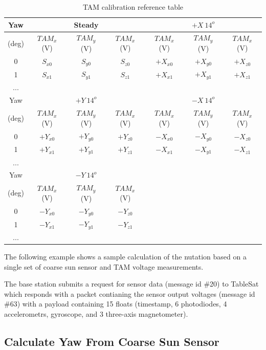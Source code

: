 \begin{table}[H]
  \centering
  \begin{tabular}{c|ccc|ccc}
    \hline
    Yaw   & & Steady & & & $+X \ 14^o$ & \\ \hline
    (deg) & $TAM_x$ (V) & $TAM_y$ (V) & $TAM_x$ (V) & $TAM_x$ (V) & $TAM_y$ (V) & $TAM_x$ (V)  \\ \hline
    0 & $S_{x0}$ & $S_{y0}$ & $S_{z0}$ & $+X_{x0}$ & $+X_{y0}$ & $+X_{z0}$ \\ \hline
    1 & $S_{x1}$ & $S_{y1}$ & $S_{z1}$ & $+X_{x1}$ & $+X_{y1}$ & $+X_{z1}$ \\ \hline
    ... & & & & & &  \\ \hline
    Yaw   & & $+Y \ 14^o$ & & & $-X \ 14^o$ & \\ \hline
    (deg) & $TAM_x$ (V) & $TAM_y$ (V) & $TAM_x$ (V) & $TAM_x$ (V) & $TAM_y$ (V) & $TAM_x$ (V)  \\ \hline
    0 & $+Y_{x0}$ & $+Y_{y0}$ & $+Y_{z0}$ & $-X_{x0}$ & $-X_{y0}$ & $-X_{z0}$ \\ \hline
    1 & $+Y_{x1}$ & $+Y_{y1}$ & $+Y_{z1}$ & $-X_{x1}$ & $-X_{y1}$ & $-X_{z1}$ \\ \hline
    ... & & & & & &  \\ \hline
    Yaw   & & $-Y \ 14^o$ & &  \\ \hline
    (deg) & $TAM_x$ (V) & $TAM_y$ (V) & $TAM_x$ (V)  \\ \hline
    0 & $-Y_{x0}$ & $-Y_{y0}$ & $-Y_{z0}$  \\ \hline
    1 & $-Y_{x1}$ & $-Y_{y1}$ & $-Y_{z1}$  \\ \hline
    ... & & & & & &  \\ \hline
  \end{tabular}
  \caption{TAM calibration reference table}
  \label{tbl:TAMCalibration}
\end{table}

The following example shows a sample calculation of the nutation based on a single set of coarse sun sensor and TAM voltage measurements.

The base station submits a request for sensor data (message id \#20) to TableSat which responds with a packet contianing the sensor output voltages (message id \#63) with a payload containing 15 floats (timestamp, 6 photodiodes, 4 accelerometrs, gyroscope, and 3 three-axis magnetometer).

\subsection{Calculate Yaw From Coarse Sun Sensor}

